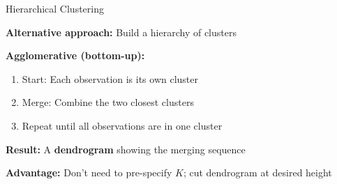 \documentclass[10pt]{beamer}
\newcommand{\highlight}[1]{\textcolor{AccentOrange}{\textbf{#1}}}
\begin{document}
\begin{frame}{Hierarchical Clustering}

  \textbf{Alternative approach:} Build a hierarchy of clusters

  \vspace{1em}
  \textbf{Agglomerative (bottom-up):}
  \begin{enumerate}
    \item Start: Each observation is its own cluster
    \item Merge: Combine the two closest clusters
    \item Repeat until all observations are in one cluster
  \end{enumerate}

  \vspace{1em}
  \textbf{Result:} A \highlight{dendrogram} showing the merging sequence

  \vspace{0.5em}
  \begin{center}
  \end{center}

  \textbf{Advantage:} Don't need to pre-specify $K$; cut dendrogram at desired height
\end{frame}

\end{document}
